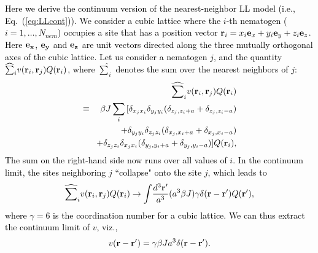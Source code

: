 \documentclass[jcp,aps,twocolumn,showpacs,supergroupedaddress,epsfig,amsmath,amssymb,eqsecnum]{revtex4}
\newcommand{\be}{\begin{equation}}
\newcommand{\ee}{\end{equation}}
\newcommand{\ba}{\begin{eqnarray}}
\newcommand{\ea}{\end{eqnarray}}
\newcommand{\rv}{{\bf r}}
\newcommand{\bing}[1]{\textcolor{black}{#1}}
\begin{document}
\bing{
Here we derive the continuum version of the nearest-neighbor LL model (i.e., Eq.~(\ref{eq:LLcont})). We consider a cubic lattice where the $i$-th nematogen ($i=1,\ldots, N_{nem}$) occupies a site that has a position vector $\rv_i = x_i {\bf{e}}_x + y_i {\bf{e}}_y + z_i {\bf{e}}_z$. Here $\bf{e}_x$, $\bf{e}_y$ and $\bf{e}_z$ are unit vectors directed along the three mutually orthogonal axes of the cubic lattice. Let us consider a nematogen $j$, and the quantity $\widehat{\sum}_i v(\rv_i,\rv_j)Q(\rv_i)$, where $\widehat{\sum}_i$ denotes the sum over the nearest neighbors of $j$: 
\ba
&&\widehat{\sum}_i v(\rv_i,\rv_j)Q(\rv_i) 
\nonumber\\
&\!\equiv\!& \beta J \sum_i \, [ \delta_{x_j x_i} \delta_{y_j y_i} (\delta_{z_j, z_i+a} + \delta_{z_j, z_i-a})
\nonumber\\
&&+ \delta_{y_j y_i} \delta_{z_j z_i} (\delta_{x_j, x_i+a} + \delta_{x_j, x_i-a})
\nonumber\\
&&+ \delta_{z_j z_i} \delta_{x_j x_i} (\delta_{y_j, y_i+a} + \delta_{y_j, y_i-a}) ] Q(\rv_i), 
\ea
The sum on the right-hand side now runs over all values of $i$. In the continuum limit, the sites neighboring $j$ ``collapse" onto the site $j$, which leads to
\be
\widehat{\sum}_i v(\rv_i,\rv_j)Q(\rv_i) \rightarrow \int \! \frac{d^3\rv'}{a^3} (a^3\beta J) \gamma \delta(\rv-\rv') Q(\rv'),
\ee
where $\gamma = 6$ is the coordination number for a cubic lattice. We can thus extract the continuum limit of $v$, viz.,
\be
v(\rv-\rv') = \gamma \beta J a^3 \delta(\rv - \rv').
\ee
}
\end{document}
